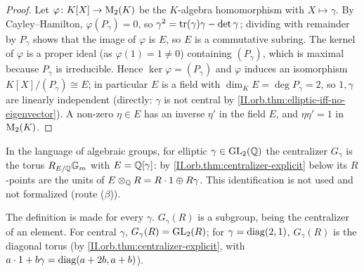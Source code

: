 \begin{theorem}
\end{theorem}
\begin{proof}
Let $\varphi\colon K[X]\to\mathrm{M}_2(K)$ be the $K$-algebra homomorphism with $X\mapsto\gamma$. By Cayley--Hamilton, $\varphi(P_\gamma)=0$, so
$\gamma^2=\operatorname{tr}(\gamma)\gamma-\det\gamma$; dividing with remainder by $P_\gamma$ shows that the image of $\varphi$ is $E$, so $E$ is a commutative
subring. The kernel of $\varphi$ is a proper ideal (as $\varphi(1)=1\ne0$) containing $(P_\gamma)$, which is maximal because $P_\gamma$ is
irreducible. Hence $\ker\varphi=(P_\gamma)$ and $\varphi$ induces an isomorphism $K[X]/(P_\gamma)\cong E$; in particular $E$ is a field with
$\dim_KE=\deg P_\gamma=2$, so $1,\gamma$ are linearly independent (directly: $\gamma$ is not central by
\cref{II.orb.thm:elliptic-iff-no-eigenvector}). A non-zero $\eta\in E$ has an inverse $\eta'$ in the field $E$, and $\eta\eta'=1$ in
$\mathrm{M}_2(K)$.
\end{proof}
\noindent In the language of algebraic groups, for elliptic $\gamma\in\mathrm{GL}_2(\mathbb{Q})$ the centralizer $G_\gamma$ is the torus
$R_{E/\mathbb{Q}}\mathbb G_m$ with $E=\mathbb{Q}[\gamma]$: by \cref{II.orb.thm:centralizer-explicit} below its $R$-points are the units of
$E\otimes_{\mathbb{Q}} R=R\cdot1\oplus R\gamma$. This identification is not used and not formalized (route ($\beta$)).

\begin{definition}[centralizers]
\end{definition}
\noindent The definition is made for every $\gamma$. $G_\gamma(R)$ is a subgroup, being the
centralizer of an element. For central $\gamma$, $G_\gamma(R)=\mathrm{GL}_2(R)$; for $\gamma=\operatorname{diag}(2,1)$, $G_\gamma(R)$ is the diagonal torus (by
\cref{II.orb.thm:centralizer-explicit}, with $a\cdot1+b\gamma=\operatorname{diag}(a+2b,a+b)$).

